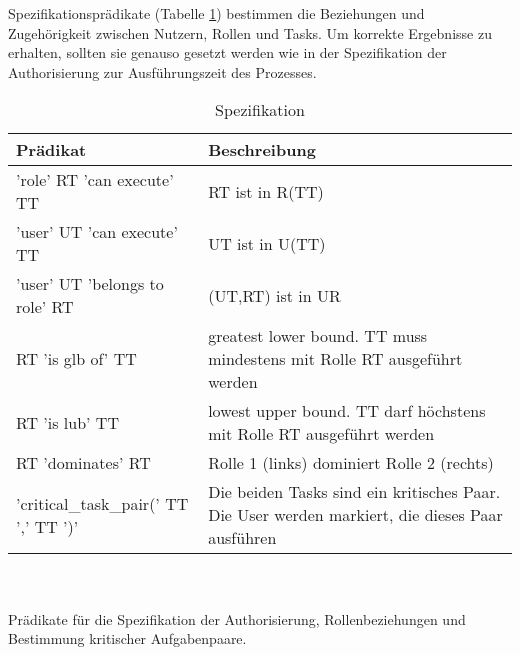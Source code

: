Spezifikationsprädikate (Tabelle \ref{tab:specification}) bestimmen die Beziehungen und Zugehörigkeit zwischen Nutzern, Rollen und Tasks. Um korrekte Ergebnisse zu erhalten, sollten sie genauso gesetzt werden wie in der Spezifikation der Authorisierung zur Ausführungszeit des Prozesses.
\begin{table}[h]
\begin{tabular} {|p{6cm}|p{10cm}|}
\hline
\textbf{Prädikat} & \textbf{Beschreibung}\\
\hline
'role' RT 'can execute' TT	& RT ist in  R(TT)\\
\hline
'user' UT 'can execute' TT 	& UT ist in U(TT)\\
\hline
'user' UT 'belongs to role' RT  & (UT,RT) ist in UR\\
\hline
RT 'is glb of' TT 		& greatest lower bound. TT muss mindestens mit Rolle RT ausgeführt werden\tnote{1}\\
\hline
RT 'is lub' TT 			& lowest upper bound. TT darf höchstens mit Rolle RT ausgeführt werden\tnote{1}\\
\hline
RT 'dominates' RT 		& Rolle 1 (links) dominiert Rolle 2 (rechts)\\
\hline
'critical{\_}task{\_}pair(' TT ',' TT ')'& Die beiden Tasks sind ein kritisches Paar. Die User werden markiert, die dieses Paar ausführen\\
\hline
\end{tabular}
\\\\\small Prädikate für die Spezifikation der Authorisierung, Rollenbeziehungen und Bestimmung kritischer Aufgabenpaare.
\caption{Spezifikation}
\label{tab:specification}
\end{table}

